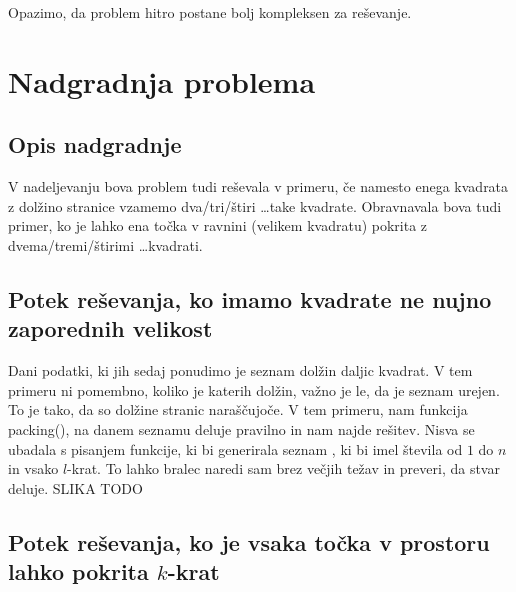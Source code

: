 \documentclass[a4paper, 11pt]{article}
\begin{document}
\noindent Opazimo, da problem hitro postane bolj kompleksen za reševanje.

\section{Nadgradnja problema}
\subsection{Opis nadgradnje}
V nadeljevanju bova problem tudi reševala v primeru, 
če namesto enega kvadrata z dolžino 
stranice vzamemo dva/tri/štiri \dots take kvadrate. 
Obravnavala bova tudi primer, ko je lahko ena točka v ravnini (velikem kvadratu) pokrita z 
dvema/tremi/štirimi \dots  kvadrati.
\subsection{Potek reševanja, ko imamo kvadrate ne nujno zaporednih velikost}
Dani podatki, ki jih sedaj ponudimo je seznam dolžin daljic kvadrat. V tem primeru ni 
pomembno, koliko je katerih dolžin, važno je le, da je seznam urejen. To je tako,
da so dolžine stranic naraščujoče.
V tem primeru, nam funkcija packing(), na danem seznamu deluje pravilno in nam najde rešitev.
Nisva se ubadala s pisanjem funkcije, ki bi generirala seznam , ki bi imel števila od 
$1$ do $n$ in vsako $l$-krat. To lahko bralec naredi sam brez večjih težav in preveri, da 
stvar deluje.
SLIKA TODO
\subsection{Potek reševanja, ko je vsaka točka v prostoru lahko pokrita $k$-krat}
\end{document}
